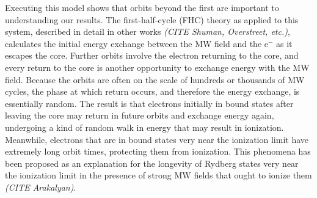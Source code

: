 \documentclass[aps,pra,preprint,groupedaddress]{revtex4-1}
\begin{document}
Executing this model shows that orbits beyond the first are important to understanding our results. The first-half-cycle (FHC) theory as applied to this system, described in detail in other works \emph{(CITE Shuman, Overstreet, etc.)}, calculates the initial energy exchange between the MW field and the e$^-$ as it escapes the core. Further orbits involve the electron returning to the core, and every return to the core is another opportunity to exchange energy with the MW field. Because the orbits are often on the scale of hundreds or thousands of MW cycles, the phase at which return occurs, and therefore the energy exchange, is essentially random. The result is that electrons initially in bound states after leaving the core may return in future orbits and exchange energy again, undergoing a kind of random walk in energy that may result in ionization. Meanwhile, electrons that are in bound states very near the ionization limit have extremely long orbit times, protecting them from ionization. This phenomena has been proposed as an explanation for the longevity of Rydberg states very near the ionization limit in the presence of strong MW fields that ought to ionize them \emph{(CITE Arakalyan)}.


\end{document}
